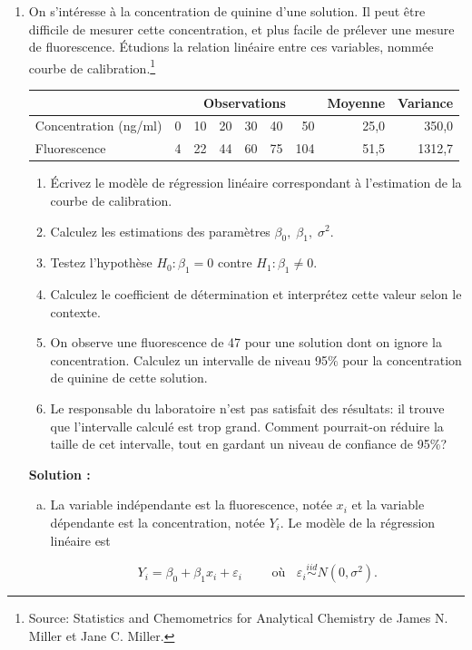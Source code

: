 \documentclass[letter, 11pt]{article}
\newcommand{\prof}[1]{\ifdefined\avecsolutions\par{\color{blue}\textbf{Solution :} #1}\par\fi}
\begin{document}
\begin{enumerate}[leftmargin=*, wide, label=\bf Exercice \arabic*:]
\item On s\rq{}intéresse à la concentration de quinine d\rq{}une solution. Il peut être difficile de mesurer cette concentration, et plus facile de prélever une mesure de fluorescence. Étudions la relation linéaire entre ces variables, nommée courbe de calibration.\footnote{Source: Statistics and Chemometrics for Analytical Chemistry  de James N. Miller et Jane C. Miller.}

\begin{table}[h!]
\centering
\begin{tabular}{l|rrrrrr|r|r}
&\multicolumn{6}{|c|}{Observations}&Moyenne&Variance\\\hline
Concentration (ng/ml) & 0 & 10 & 20 & 30 & 40 & 50&25,0&350,0\\\hline
Fluorescence  & 4 & 22 & 44 & 60 & 75 & 104&51,5&1312,7
\end{tabular}
\end{table}

\begin{enumerate}
\item  Écrivez le modèle de régression linéaire correspondant à l\rq{}estimation de la courbe de calibration.
\item  Calculez les estimations des paramètres $\beta_0,\; \beta_1, \; \sigma^2$.
\item  Testez l\rq{}hypothèse $H_0 : \beta_1 =  0$ contre $H_1 : \beta_1 \ne 0$.
\item   Calculez le coefficient de détermination et interprétez cette valeur selon le contexte.
\item   On observe une fluorescence de 47 pour une solution dont on ignore la concentration. Calculez un intervalle de niveau 95$\%$ pour la concentration de quinine de cette solution.
\item   Le responsable du laboratoire n\rq{}est pas satisfait des résultats: il trouve que l\rq{}intervalle calculé est trop grand. Comment pourrait-on réduire la taille de cet intervalle, tout en gardant un niveau de confiance de 95\%?\\
\end{enumerate}

\prof{ \begin{enumerate}[a) ]\itemsep3mm
\item  La variable indépendante est la fluorescence, notée $x_i$ et la variable dépendante est la concentration, notée $Y_i$. Le modèle de la régression linéaire est 

$$ Y_i = \beta_0 + \beta_1 x_i + \varepsilon_i \qquad\mbox{ où } \;\;\varepsilon_i \overset{iid}{\sim}N(0,\sigma^2). $$


\end{enumerate}}
\end{enumerate}
\end{document}
